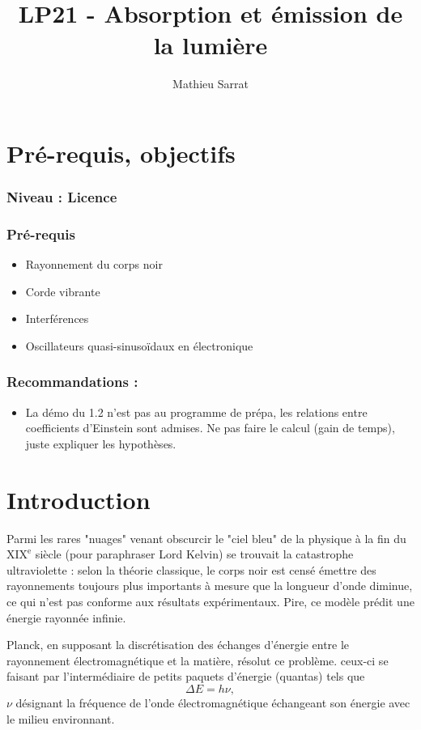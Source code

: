 \documentclass[11pt,a4paper]{report}
\author{Mathieu Sarrat}
\title{LP21 - Absorption et émission de la lumière}
\begin{document}
\maketitle

\section*{Pré-requis, objectifs}
\subsubsection*{Niveau : Licence}

\subsubsection*{Pré-requis}
\begin{itemize}
	\item Rayonnement du corps noir
	\item Corde vibrante
	\item Interférences
	\item Oscillateurs quasi-sinusoïdaux en électronique
\end{itemize}

\subsubsection*{Recommandations :}
\begin{itemize}
	\item La démo du 1.2 n'est pas au programme de prépa, les relations entre coefficients d'Einstein 			sont admises. Ne pas faire le calcul (gain de temps), juste expliquer les hypothèses.
\end{itemize}
\newpage
\section*{Introduction}

Parmi les rares "nuages" venant obscurcir le "ciel bleu" de la physique à la fin du $\text{XIX}^\text{e}$ siècle (pour paraphraser Lord Kelvin) se trouvait la catastrophe ultraviolette : selon la théorie classique, le corps noir est censé émettre des rayonnements toujours plus importants à mesure que la longueur d'onde diminue, ce qui n'est pas conforme aux résultats expérimentaux. Pire, ce modèle prédit une énergie rayonnée infinie.

Planck, en supposant la discrétisation des échanges d'énergie entre le rayonnement électromagnétique et la matière, résolut ce problème. ceux-ci se faisant par l'intermédiaire de petits paquets d'énergie (quantas) tels que
\begin{equation}
	\Delta E = h \nu,
\end{equation}
$\nu$ désignant la fréquence de l'onde électromagnétique échangeant son énergie avec le milieu environnant.
\end{document}
